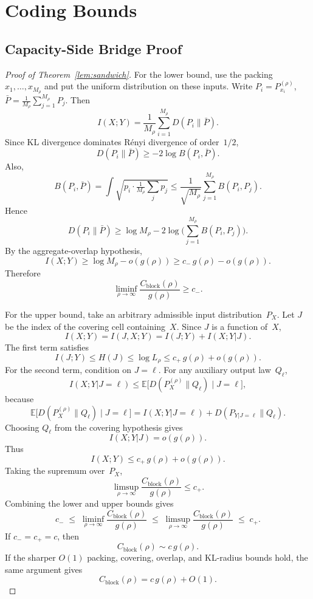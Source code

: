 \documentclass[lettersize,onecolumn]{IEEEtran}
\newcommand{\E}{\mathbb{E}}
\newcommand{\snr}{\rho}
\begin{document}
\section{Coding Bounds}\label{app:coding_bounds}

\subsection{Capacity-Side Bridge Proof}\label{app:sandwich_proof}

\begin{proof}[Proof of Theorem~\ref{lem:sandwich}]
For the lower bound, use the packing $x_1,\dots,x_{M_\snr}$ and put
the uniform distribution on these inputs. Write
$P_i = P_{x_i}^{(\snr)}$,
$\bar{P} = \frac{1}{M_\snr}\sum_{j=1}^{M_\snr} P_j$.
Then
\[
I(X;Y) = \frac{1}{M_\snr}\sum_{i=1}^{M_\snr}
D(P_i \| \bar{P}).
\]
Since KL divergence dominates R\'enyi divergence of order~$1/2$,
\[
D(P_i \| \bar{P}) \ge -2\log B(P_i, \bar{P}).
\]
Also,
\[
B(P_i, \bar{P})
= \int\!\sqrt{p_i \cdot \tfrac{1}{M_\snr}\sum_j p_j}
\le \frac{1}{\sqrt{M_\snr}}\sum_{j=1}^{M_\snr}
B(P_i, P_j).
\]
Hence
\[
D(P_i \| \bar{P}) \ge \log M_\snr
- 2\log\!\bigg(\sum_{j=1}^{M_\snr} B(P_i, P_j)\bigg).
\]
By the aggregate-overlap hypothesis,
\[
I(X;Y) \ge \log M_\snr - o(g(\snr))
\ge c_-\,g(\snr) - o(g(\snr)).
\]
Therefore
\[
\liminf_{\snr\to\infty}
\frac{C_{\mathrm{block}}(\snr)}{g(\snr)} \ge c_-.
\]

For the upper bound, take an arbitrary admissible input
distribution~$P_X$. Let $J$ be the index of the covering cell
containing~$X$. Since $J$ is a function of~$X$,
\[
I(X;Y) = I(J,X;Y) = I(J;Y) + I(X;Y|J).
\]
The first term satisfies
\[
I(J;Y) \le H(J) \le \log L_\snr
\le c_+\,g(\snr) + o(g(\snr)).
\]
For the second term, condition on $J=\ell$. For any auxiliary output
law~$Q_\ell$,
\[
I(X;Y|J=\ell)
\le \E\!\big[D(P_X^{(\snr)} \| Q_\ell) \mid J=\ell\big],
\]
because
\[
\E\!\big[D(P_X^{(\snr)} \| Q_\ell) \mid J=\ell\big]
= I(X;Y|J=\ell) + D(P_{Y|J=\ell} \| Q_\ell).
\]
Choosing $Q_\ell$ from the covering hypothesis gives
\[
I(X;Y|J) = o(g(\snr)).
\]
Thus
\[
I(X;Y) \le c_+\,g(\snr) + o(g(\snr)).
\]
Taking the supremum over~$P_X$,
\[
\limsup_{\snr\to\infty}
\frac{C_{\mathrm{block}}(\snr)}{g(\snr)} \le c_+.
\]
Combining the lower and upper bounds gives
\[
c_- \;\le\;
\liminf_{\snr\to\infty} \frac{C_{\mathrm{block}}(\snr)}{g(\snr)}
\;\le\;
\limsup_{\snr\to\infty} \frac{C_{\mathrm{block}}(\snr)}{g(\snr)}
\;\le\; c_+.
\]
If $c_- = c_+ = c$, then
\[
C_{\mathrm{block}}(\snr) \sim c\,g(\snr).
\]
If the sharper $O(1)$ packing, covering, overlap, and KL-radius
bounds hold, the same argument gives
\[
C_{\mathrm{block}}(\snr) = c\,g(\snr) + O(1).
\]
\end{proof}
\end{document}
